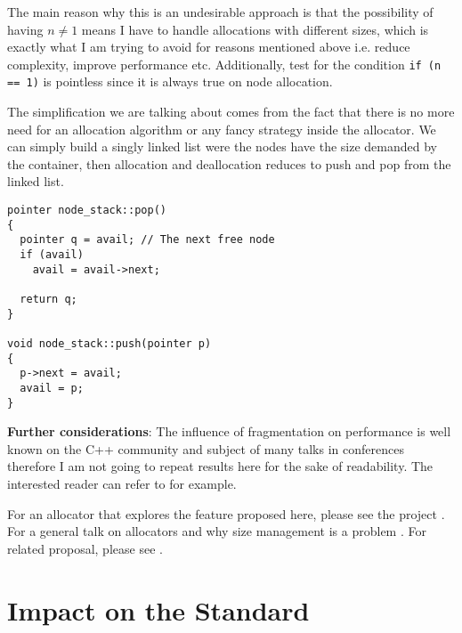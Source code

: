 \documentclass[11pt]{article}
\begin{document}
\noindent
The main reason why this is an undesirable approach is that the
possibility of having $n \ne 1$ means I have to handle allocations
with different sizes, which is exactly what I am trying to avoid for
reasons mentioned above i.e. reduce complexity, improve performance
etc. Additionally, test for the condition \texttt{if (n == 1)} is
pointless since it is always true on node allocation.

The simplification we are talking about comes from the fact that there
is no more need for an allocation algorithm or any fancy strategy
inside the allocator. We can simply build a singly linked list were
the nodes have the size demanded by the container, then allocation and
deallocation reduces to push and pop from the linked list.

\medskip
\begin{lstlisting}
pointer node_stack::pop()
{
  pointer q = avail; // The next free node
  if (avail)
    avail = avail->next;

  return q;
}

void node_stack::push(pointer p)
{
  p->next = avail;
  avail = p;
}

\end{lstlisting}

\medskip
\noindent
{\bf Further considerations}: The influence of fragmentation on
performance is well known on the C++ community and subject of many
talks in conferences therefore I am not going to repeat results here
for the sake of readability. The interested reader can refer to
\cite{chandler, meyers} for example.

For an allocator that explores the feature proposed here, please see
the project \cite{rtcpp}. For a general
talk on allocators and why size management is a problem
\cite{alexandrescu}. For related proposal, please see \cite{prop1}.



\section{Impact on the Standard} \label{impact}
\end{document}
